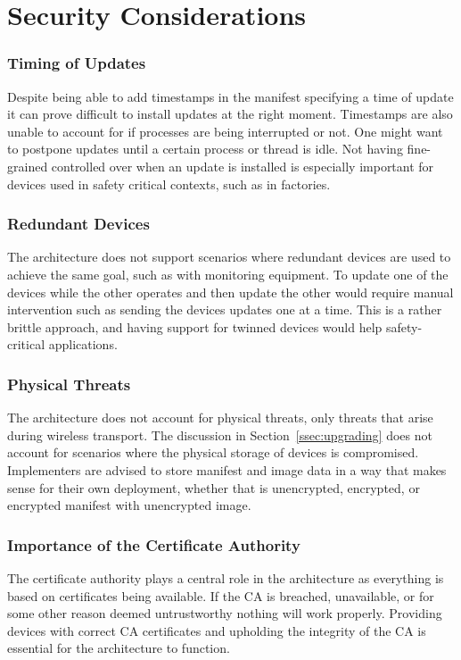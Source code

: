 \documentclass[0-thesis.tex]{subfiles}
\begin{document}
\section{Security Considerations}
\label{sec:security-considerations}

\subsubsection{Timing of Updates}
Despite being able to add timestamps in the manifest specifying a time of update it can
prove difficult to install updates at the right moment. Timestamps are also unable to
account for if processes are being interrupted or not. One might want to postpone updates
until a certain process or thread is idle. Not having fine-grained controlled over when an
update is installed is especially important for devices used in safety critical contexts,
such as in factories.

\subsubsection{Redundant Devices}
The architecture does not support scenarios where redundant devices are used to achieve
the same goal, such as with monitoring equipment. To update one of the devices while the other
operates and then update the other would require manual intervention such as sending the
devices updates one at a time. This is a rather brittle approach, and having support for
twinned devices would help safety-critical applications.

\subsubsection{Physical Threats}
The architecture does not account for physical threats, only threats that arise during
wireless transport. The discussion in Section~\ref{ssec:upgrading} does not account for
scenarios where the physical storage of devices is compromised. Implementers are advised
to store manifest and image data in a way that makes sense for their own deployment,
whether that is unencrypted, encrypted, or encrypted manifest with unencrypted image.

\subsubsection{Importance of the Certificate Authority}
The certificate authority plays a central role in the architecture as everything is based
on certificates being available. If the CA is breached, unavailable, or for some other
reason deemed untrustworthy nothing will work properly. Providing devices with correct CA
certificates and upholding the integrity of the CA is essential for the architecture to
function.
\end{document}

